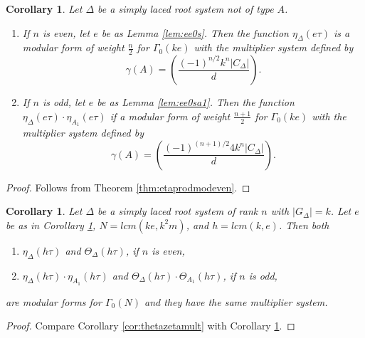 \documentclass[11pt,a4paper]{amsart}
\newtheorem{corollary}[theorem]{Corollary}
\theoremstyle{definition}
\begin{document}
\begin{corollary}  Let $\Delta$ be a simply laced root system not of type $A$. 
\begin{enumerate}
\item If $n$ is even, let $e$ be as Lemma \ref{lem:ee0s}. Then the function $\eta_{\Delta}(e\tau)$ is a modular form of weight $\frac{n}{2}$ for $\Gamma_0(ke)$ with the multiplier system defined by
\[ \gamma(A)=\left( \frac{(-1)^{n/2}k^n|C_{\Delta}|}{d} \right). \]
\item If $n$ is odd, let $e$ be as Lemma \ref{lem:ee0sa1}. Then the function $\eta_{\Delta}(e\tau) \cdot \eta_{A_1}(e\tau) $ if a modular form of weight $\frac{n+1}{2}$ for $\Gamma_0(ke)$ with the multiplier system defined by
\[ \gamma(A)=\left( \frac{(-1)^{(n+1)/2}4k^n|C_{\Delta}|}{d} \right). \]
\end{enumerate}
\label{cor:etamultsyscalc}
\end{corollary}
\begin{proof} Follows from Theorem \ref{thm:etaprodmodeven}.
\end{proof}
\begin{corollary} Let $\Delta$ be a simply laced root system of rank $n$ with $|G_{\Delta}|=k$. Let $e$ be as in Corollary \ref{cor:etamultsyscalc}, $N=lcm(ke,k^2m)$, and 
$h=lcm(k,e)$.  
Then both
\begin{enumerate}
\item  $\eta_{\Delta}(h\tau)$  and $\Theta_{\Delta}(h\tau)$, if $n$  is even,
\item $\eta_{\Delta}(h\tau) \cdot \eta_{A_1}(h\tau)$ and $\Theta_{\Delta}(h\tau) \cdot \Theta_{A_1}(h\tau)$,  if $n$ is odd,
\end{enumerate}
are modular forms for $\Gamma_0(N)$ and they have the same multiplier system.
\label{cor:etathetamod}
\end{corollary}
\begin{proof}
Compare Corollary \ref{cor:thetazetamult} with Corollary \ref{cor:etamultsyscalc}.
\end{proof}
\end{document}
